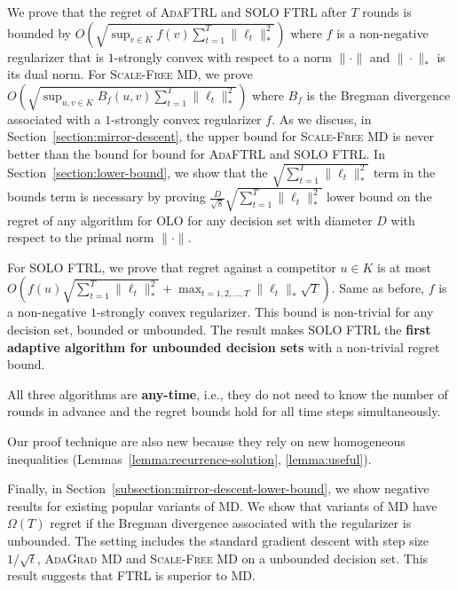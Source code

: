We prove that the regret of \textsc{AdaFTRL} and \textsc{SOLO FTRL} after $T$
rounds is bounded by $O \left(\sqrt{\sup_{v \in K} f(v)
\sum_{t=1}^T\|\ell_t\|_*^2} \right)$ where $f$ is a non-negative regularizer
that is $1$-strongly convex with respect to a norm $\|\cdot\|$ and
$\|\cdot\|_*$ is its dual norm. For \textsc{Scale-Free MD}, we prove $O
\left(\sqrt{\sup_{u,v \in K} B_f(u,v) \sum_{t=1}^T\|\ell_t\|_*^2} \right)$
where $B_f$ is the Bregman divergence associated with a $1$-strongly convex
regularizer $f$.  As we discuss, in Section~\ref{section:mirror-descent}, the
upper bound for \textsc{Scale-Free MD} is never better than the bound for bound
for \textsc{AdaFTRL} and \textsc{SOLO FTRL}.  In
Section~\ref{section:lower-bound}, we show that the $\sqrt{\sum_{t=1}^T
\|\ell_t\|_*^2}$ term in the bounds term is necessary by proving
$\frac{D}{\sqrt{8}} \sqrt{\sum_{t=1}^T\|\ell_t\|_*^2}$ lower bound on the
regret of any algorithm for OLO for any decision set with diameter $D$ with
respect to the primal norm $\|\cdot\|$.

For \textsc{SOLO FTRL}, we prove that regret against a competitor $u \in K$ is
at most $O \left(f(u) \sqrt{\sum_{t=1}^T \|\ell_t\|_*^2} + \max_{t=1,2,\dots,T}
\|\ell_t\|_* \sqrt{T} \right)$.  Same as before, $f$ is a non-negative
$1$-strongly convex regularizer. This bound is non-trivial for any decision
set, bounded or unbounded.  The result makes \textsc{SOLO FTRL} the
\textbf{first adaptive algorithm for unbounded decision sets} with a
non-trivial regret bound.

All three algorithms are \textbf{any-time}, i.e., they do not need to know the
number of rounds in advance and the regret bounds hold for all time steps
simultaneously.

Our proof technique are also new because they rely on new homogeneous
inequalities (Lemmas~\ref{lemma:recurrence-solution}, \ref{lemma:useful}).

Finally, in Section~\ref{subsection:mirror-descent-lower-bound}, we show
negative results for existing popular variants of \textsc{MD}. We show that
variants of \textsc{MD} have $\Omega(T)$ regret if the Bregman divergence
associated with the regularizer is unbounded.  The setting includes the
standard gradient descent with step size $1/\sqrt{t}$, \textsc{AdaGrad MD} and
\textsc{Scale-Free MD} on a unbounded decision set. This result suggests that
\textsc{FTRL} is superior to \textsc{MD}.
